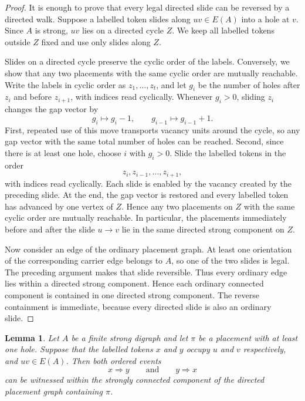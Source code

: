 \documentclass[11pt]{article}
\newtheorem{lemma}[theorem]{Lemma}
\theoremstyle{remark}
\numberwithin{equation}{section}
\begin{document}
\begin{proof}
It is enough to prove that every legal directed slide can be reversed by a directed walk. Suppose a labelled token slides along $uv\in E(A)$ into a hole at $v$. Since $A$ is strong, $uv$ lies on a directed cycle $Z$. We keep all labelled tokens outside $Z$ fixed and use only slides along $Z$.

Slides on a directed cycle preserve the cyclic order of the labels. Conversely, we show that any two placements with the same cyclic order are mutually reachable. Write the labels in cyclic order as $z_1,\ldots,z_t$, and let $g_i$ be the number of holes after $z_i$ and before $z_{i+1}$, with indices read cyclically. Whenever $g_i>0$, sliding $z_i$ changes the gap vector by
\begin{equation}\label{eq:gap-transfer}
g_i\mapsto g_i-1,
\qquad
g_{i-1}\mapsto g_{i-1}+1.
\end{equation}
First, repeated use of this move transports vacancy units around the cycle, so any gap vector with the same total number of holes can be reached.
Second, since there is at least one hole, choose $i$ with $g_i>0$. Slide the labelled tokens in the order
\[
z_i,z_{i-1},\ldots,z_{i+1},
\]
with indices read cyclically. Each slide is enabled by the vacancy created by the preceding slide. At the end, the gap vector is restored and every labelled token has advanced by one vertex of $Z$. Hence any two
placements on $Z$ with the same cyclic order are mutually reachable. In particular, the placements immediately before and after the slide $u\to v$ lie in the same directed strong component on $Z$.

Now consider an edge of the ordinary placement graph. At least one orientation of the corresponding carrier edge belongs to $A$, so one of the two slides is legal. The preceding argument makes that slide reversible. Thus every ordinary edge lies within a directed strong component. Hence each ordinary connected component is contained in one directed strong component. The reverse containment is immediate, because every directed slide is also an ordinary slide.
\end{proof}

\begin{lemma}\label{lem:contact-symmetry}
Let $A$ be a finite strong digraph and let $\pi$ be a placement with at least one hole. Suppose that the labelled tokens $x$ and $y$ occupy $u$ and $v$ respectively, and $uv\in E(A)$. Then both ordered events
\[
x\Rightarrow y
\qquad\text{and}\qquad
y\Rightarrow x
\]
can be witnessed within the strongly connected component of the directed placement graph containing $\pi$.
\end{lemma}
\end{document}
